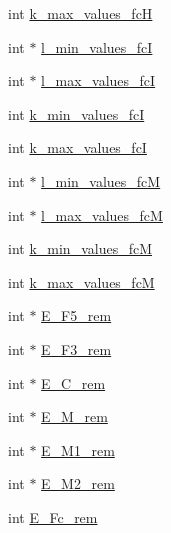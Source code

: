 \begin{DoxyCompactItemize}
\item 
int \mbox{\hyperlink{group__kl__neighborhood__mfe_a8f1fade15528029e22fd3efc1d0a871b}{k\+\_\+max\+\_\+values\+\_\+fcH}}
\item 
int $\ast$ \mbox{\hyperlink{group__kl__neighborhood__mfe_ab08a49838984eb8fe427730bc8154b43}{l\+\_\+min\+\_\+values\+\_\+fcI}}
\item 
int $\ast$ \mbox{\hyperlink{group__kl__neighborhood__mfe_a98cd89c6459c18bd647a18a9b17bfb93}{l\+\_\+max\+\_\+values\+\_\+fcI}}
\item 
int \mbox{\hyperlink{group__kl__neighborhood__mfe_aceb32df051435d3ecc25910688585e7b}{k\+\_\+min\+\_\+values\+\_\+fcI}}
\item 
int \mbox{\hyperlink{group__kl__neighborhood__mfe_a860e9a6784233960a1d45e711de381d8}{k\+\_\+max\+\_\+values\+\_\+fcI}}
\item 
int $\ast$ \mbox{\hyperlink{group__kl__neighborhood__mfe_a2073680dc7da5be8a404fd4036687973}{l\+\_\+min\+\_\+values\+\_\+fcM}}
\item 
int $\ast$ \mbox{\hyperlink{group__kl__neighborhood__mfe_a80385035862e790db8ffb1e81438ec2a}{l\+\_\+max\+\_\+values\+\_\+fcM}}
\item 
int \mbox{\hyperlink{group__kl__neighborhood__mfe_a482a03df6cd5ef76ae591d4686a051d7}{k\+\_\+min\+\_\+values\+\_\+fcM}}
\item 
int \mbox{\hyperlink{group__kl__neighborhood__mfe_a89e4d533071054720a83ea70a97a4105}{k\+\_\+max\+\_\+values\+\_\+fcM}}
\item 
int $\ast$ \mbox{\hyperlink{group__kl__neighborhood__mfe_af414b6e4fc8a32e323998504cbdf3db8}{E\+\_\+\+F5\+\_\+rem}}
\item 
int $\ast$ \mbox{\hyperlink{group__kl__neighborhood__mfe_ae4b7da33649295a9c835a6f29c3f2fab}{E\+\_\+\+F3\+\_\+rem}}
\item 
int $\ast$ \mbox{\hyperlink{group__kl__neighborhood__mfe_a5da3f78defa76f754b726aac74104b9d}{E\+\_\+\+C\+\_\+rem}}
\item 
int $\ast$ \mbox{\hyperlink{group__kl__neighborhood__mfe_a14c12c19248fd07a78e0e1d15c9ead83}{E\+\_\+\+M\+\_\+rem}}
\item 
int $\ast$ \mbox{\hyperlink{group__kl__neighborhood__mfe_a18476d051e6bb22c3339cc1c6fedbb2c}{E\+\_\+\+M1\+\_\+rem}}
\item 
int $\ast$ \mbox{\hyperlink{group__kl__neighborhood__mfe_af68fca5278bdefe01539e4e59816554d}{E\+\_\+\+M2\+\_\+rem}}
\item 
int \mbox{\hyperlink{group__kl__neighborhood__mfe_a8f69e0e4572dae4bf862eb0d5f25b95f}{E\+\_\+\+Fc\+\_\+rem}}

\end{DoxyCompactItemize}
